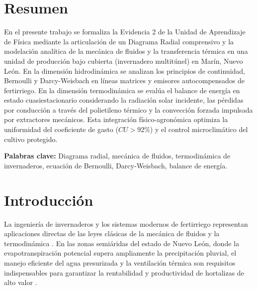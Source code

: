\documentclass[12pt,spanish,letterpaper,oneside]{article}
\begin{document}
\hypersetup{pageanchor=false}
\begingroup
\fontsize{14}{17}\selectfont
\renewcommand{\Huge}{\fontsize{14}{17}\selectfont\bfseries}
\renewcommand{\large}{\fontsize{14}{17}\selectfont}
\templatePortrait
\clearpage
\endgroup
\hypersetup{pageanchor=true}
\templatePagecfg
\singlespacing
\setlength{\tabcolsep}{8pt}
\renewcommand{\arraystretch}{1.18}

\section*{Resumen}
En el presente trabajo se formaliza la Evidencia 2 de la Unidad de Aprendizaje de Física mediante la articulación de un Diagrama Radial comprensivo y la modelación analítica de la mecánica de fluidos y la transferencia térmica en una unidad de producción bajo cubierta (invernadero multitúnel) en Marín, Nuevo León. En la dimensión hidrodinámica se analizan los principios de continuidad, Bernoulli y Darcy-Weisbach en líneas matrices y emisores autocompensados de fertirriego. En la dimensión termodinámica se evalúa el balance de energía en estado cuasiestacionario considerando la radiación solar incidente, las pérdidas por conducción a través del polietileno térmico y la convección forzada impulsada por extractores mecánicos. Esta integración físico-agronómica optimiza la uniformidad del coeficiente de gasto ($CU > 92\%$) y el control microclimático del cultivo protegido.

\vspace{0.4cm}
\noindent\textbf{Palabras clave:} Diagrama radial, mecánica de fluidos, termodinámica de invernaderos, ecuación de Bernoulli, Darcy-Weisbach, balance de energía.

\section{Introducción}
La ingeniería de invernaderos y los sistemas modernos de fertirriego representan aplicaciones directas de las leyes clásicas de la mecánica de fluidos y la termodinámica \parencite{streeter1998,giancoli2008}. En las zonas semiáridas del estado de Nuevo León, donde la evapotranspiración potencial supera ampliamente la precipitación pluvial, el manejo eficiente del agua presurizada y la ventilación térmica son requisitos indispensables para garantizar la rentabilidad y productividad de hortalizas de alto valor \parencite{serway2018}.
\end{document}
